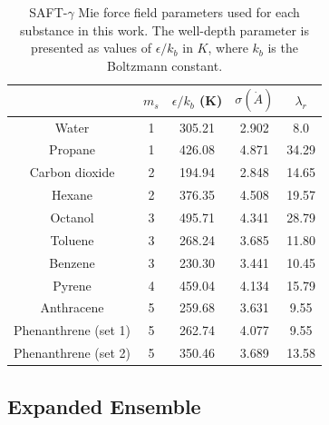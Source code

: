 \documentclass[preprint]{elsarticle}
\begin{document}
	\begin{table}
		\centering
		\caption{SAFT-$\gamma$ Mie force field parameters used for each substance in this work. The well-depth parameter is presented as values of $\epsilon/k_b$ in $K$, where $k_b$ is the Boltzmann constant.}
		\label{tbl:parameters}
		\begin{tabular}{ccccc}
			\hline\hline
			& $m_s$ & $\epsilon/k_{b}$ (K) & $\sigma (\dot{A})$ & $\lambda_r$ \\ \hline
			Water \cite{lobanova2016}        & 1     & 305.21               & 2.902              & 8.0         \\
			Propane \cite{herdes2015}        & 1     & 426.08               & 4.871              & 34.29       \\
			Carbon dioxide \cite{herdes2015} & 2     & 194.94               & 2.848              & 14.65       \\
			Hexane \cite{herdes2015}         & 2     & 376.35               & 4.508              & 19.57       \\
			Octanol \cite{ervik2016}         & 3     & 495.71               & 4.341              & 28.79       \\
			Toluene \cite{muller2017}        & 3     & 268.24               & 3.685              & 11.80       \\
			Benzene \cite{muller2017}        & 3     & 230.30               & 3.441              & 10.45       \\
			Pyrene \cite{muller2017}         & 4     & 459.04               & 4.134              & 15.79       \\
			Anthracene \cite{muller2017}     & 5     & 259.68               & 3.631              & 9.55        \\
			Phenanthrene (set 1)               & 5     & 262.74               & 4.077              & 9.55        \\
			Phenanthrene (set 2)               & 5     & 350.46               & 3.689              & 13.58        \\ \hline\hline
		\end{tabular}
		
	\end{table}
	
	\subsection{Expanded Ensemble}
	\label{sec:expanded ensemble}
	
\end{document}
